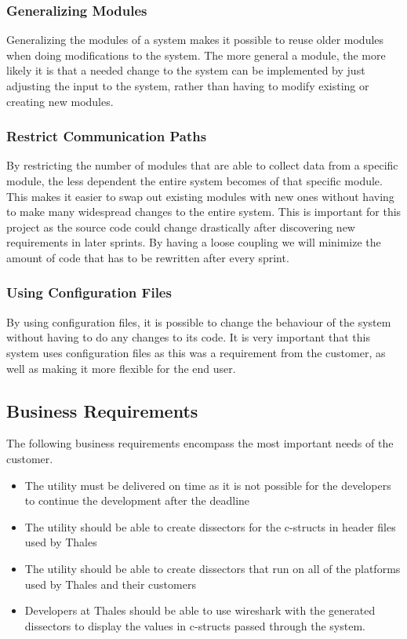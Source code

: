 \subsubsection{Generalizing Modules}
Generalizing the modules of a system makes it possible to reuse older modules when doing modifications to the system. The more general a module, the more likely it is that a needed change to the system can be implemented by just adjusting the input to the system, rather than having to modify existing or creating new modules.

\subsubsection{Restrict Communication Paths}
By restricting the number of modules that are able to collect data from a specific module, the less dependent the entire system becomes of that specific module. This makes it easier to swap out existing modules with new ones without having to make many widespread changes to the entire system. This is important for this project as the source code could change drastically after discovering new requirements in later sprints. By having a loose coupling we will minimize the amount of code that has to be rewritten after every sprint.

\subsubsection{Using Configuration Files}
By using configuration files, it is possible to change the behaviour of the system without having to do any changes to its code. It is very important that this system uses configuration files as this was a requirement from the customer, as well as making it more flexible for the end user.

\subsection{Business Requirements}
The following business requirements encompass the most important needs of the customer.
\begin{itemize}
\item The \gls{utility} must be delivered on time as it is not possible for the developers to continue the development after the deadline
\item The \gls{utility} should be able to create \glspl{dissector} for the \Gls{c}-\glspl{struct} in \gls{header} files used by Thales
\item The \gls{utility} should be able to create \glspl{dissector} that run on all of the platforms used by Thales and their customers
\item Developers at Thales should be able to use \Gls{wireshark} with the generated \glspl{dissector} to display the values in \Gls{c}-\glspl{struct} passed through the system.
\end{itemize}

